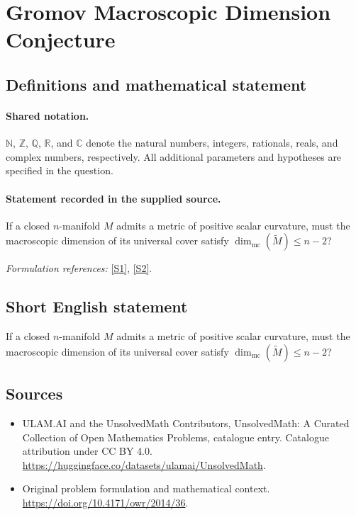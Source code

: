 \documentclass[11pt]{article}
\newcommand{\sref}[2]{\hyperlink{source:#1:#2}{[S#2]}}
\begin{document}
\section{Gromov Macroscopic Dimension Conjecture}\label{statement}

\subsection{Definitions and mathematical statement}

\paragraph{Shared notation.}$\mathbb N$, $\mathbb Z$, $\mathbb Q$, $\mathbb R$, and $\mathbb C$ denote the natural numbers, integers, rationals, reals, and complex numbers, respectively. All additional parameters and hypotheses are specified in the question.


\paragraph{Statement recorded in the supplied source.}
If a closed $n$-manifold $M$ admits a metric of positive scalar curvature, must the macroscopic dimension of its universal cover satisfy $\dim_{\mathrm{mc}}(\widetilde M)\leq n-2$?
\par\smallskip\textit{Formulation references:} \sref{statement}{1}, \sref{statement}{2}.
\subsection{Short English statement}
If a closed $n$-manifold $M$ admits a metric of positive scalar curvature, must the macroscopic dimension of its universal cover satisfy $\dim_{\mathrm{mc}}(\widetilde M)\leq n-2$?
\subsection{Sources}
\begin{itemize}
\item[\hypertarget{source:statement:1}{S1}] ULAM.AI and the UnsolvedMath Contributors, UnsolvedMath: A Curated Collection of Open Mathematics Problems, catalogue entry. Catalogue attribution under CC BY 4.0.
\url{https://huggingface.co/datasets/ulamai/UnsolvedMath}.
\item[\hypertarget{source:statement:2}{S2}] Original problem formulation and mathematical context.
\url{https://doi.org/10.4171/owr/2014/36}.
\end{itemize}
\label{end:statement}
\end{document}
